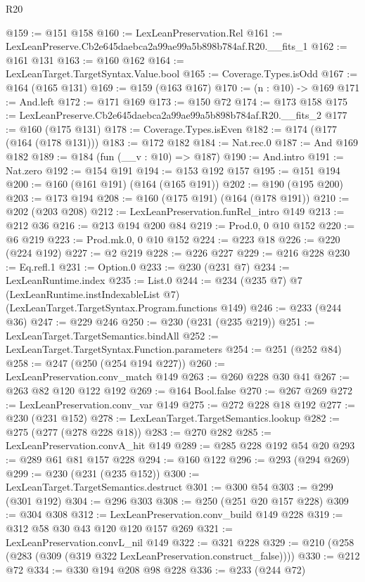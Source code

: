 \begin{lexlean}{R20}
\begin{coremodule}
@159 := @151 @158
@160 := LexLeanPreservation.Rel
@161 := LexLeanPreserve.Cb2e645daebca2a99ae99a5b898b784af.R20.__fits_1
@162 := @161 @131
@163 := @160 @162
@164 := LexLeanTarget.TargetSyntax.Value.bool
@165 := Coverage.Types.isOdd
@167 := @164 (@165 @131)
@169 := @159 (@163 @167)
@170 := (n : @10) -> @169
@171 := And.left
@172 := @171 @169
@173 := @150 @72
@174 := @173 @158
@175 := LexLeanPreserve.Cb2e645daebca2a99ae99a5b898b784af.R20.__fits_2
@177 := @160 (@175 @131)
@178 := Coverage.Types.isEven
@182 := @174 (@177 (@164 (@178 @131)))
@183 := @172 @182
@184 := Nat.rec.{0}
@187 := And @169 @182
@189 := @184 (fun (__v : @10) => @187)
@190 := And.intro
@191 := Nat.zero
@192 := @154 @191
@194 := @153 @192 @157
@195 := @151 @194
@200 := @160 (@161 @191) (@164 (@165 @191))
@202 := @190 (@195 @200)
@203 := @173 @194
@208 := @160 (@175 @191) (@164 (@178 @191))
@210 := @202 (@203 @208)
@212 := LexLeanPreservation.funRel_intro @149
@213 := @212 @36
@216 := @213 @194 @200 @84
@219 := Prod.{0, 0} @10 @152
@220 := @6 @219
@223 := Prod.mk.{0, 0} @10 @152
@224 := @223 @18
@226 := @220 (@224 @192)
@227 := @2 @219
@228 := @226 @227
@229 := @216 @228
@230 := Eq.refl.{1}
@231 := Option.{0}
@233 := @230 (@231 @7)
@234 := LexLeanRuntime.index
@235 := List.{0}
@244 := @234
    (@235 @7)
    @7
    (LexLeanRuntime.instIndexableList @7)
    (LexLeanTarget.TargetSyntax.Program.functions @149)
@246 := @233 (@244 @36)
@247 := @229 @246
@250 := @230 (@231 (@235 @219))
@251 := LexLeanTarget.TargetSemantics.bindAll
@252 := LexLeanTarget.TargetSyntax.Function.parameters
@254 := @251 (@252 @84)
@258 := @247 (@250 (@254 @194 @227))
@260 := LexLeanPreservation.conv_match @149
@263 := @260 @228 @30 @41
@267 := @263 @82 @120 @122 @192
@269 := @164 Bool.false
@270 := @267 @269
@272 := LexLeanPreservation.conv_var @149
@275 := @272 @228 @18 @192
@277 := @230 (@231 @152)
@278 := LexLeanTarget.TargetSemantics.lookup
@282 := @275 (@277 (@278 @228 @18))
@283 := @270 @282
@285 := LexLeanPreservation.convA_hit @149
@289 := @285 @228 @192 @54 @20
@293 := @289 @61 @81 @157 @228
@294 := @160 @122
@296 := @293 (@294 @269)
@299 := @230 (@231 (@235 @152))
@300 := LexLeanTarget.TargetSemantics.destruct
@301 := @300 @54
@303 := @299 (@301 @192)
@304 := @296 @303
@308 := @250 (@251 @20 @157 @228)
@309 := @304 @308
@312 := LexLeanPreservation.conv_build @149 @228
@319 := @312 @58 @30 @43 @120 @120 @157 @269
@321 := LexLeanPreservation.convL_nil @149
@322 := @321 @228
@329 := @210 (@258 (@283 (@309 (@319 @322 LexLeanPreservation.construct_false))))
@330 := @212 @72
@334 := @330 @194 @208 @98 @228
@336 := @233 (@244 @72)

\end{coremodule}
\end{lexlean}
